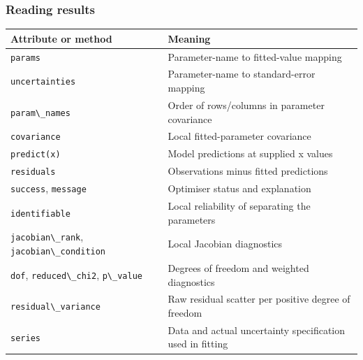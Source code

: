 \documentclass[
  british,
  10pt,
  a4paper,
]{article}
\newcommand{\passthrough}[1]{#1}
\begin{document}

\subsubsection{Reading results}\label{reading-results}

\begin{longtable}[]{@{}
  >{\raggedright\arraybackslash}p{}
  >{\raggedright\arraybackslash}p{}@{}}
\toprule\noalign{}
\begin{minipage}[b]{\linewidth}\raggedright
Attribute or method
\end{minipage} & \begin{minipage}[b]{\linewidth}\raggedright
Meaning
\end{minipage} \\
\midrule\noalign{}
\endhead
\bottomrule\noalign{}
\endlastfoot
\passthrough{\lstinline!params!} & Parameter-name to fitted-value
mapping \\
\passthrough{\lstinline!uncertainties!} & Parameter-name to
standard-error mapping \\
\passthrough{\lstinline!param\_names!} & Order of rows/columns in
parameter covariance \\
\passthrough{\lstinline!covariance!} & Local fitted-parameter
covariance \\
\passthrough{\lstinline!predict(x)!} & Model predictions at supplied x
values \\
\passthrough{\lstinline!residuals!} & Observations minus fitted
predictions \\
\passthrough{\lstinline!success!}, \passthrough{\lstinline!message!} &
Optimiser status and explanation \\
\passthrough{\lstinline!identifiable!} & Local reliability of separating
the parameters \\
\passthrough{\lstinline!jacobian\_rank!},
\passthrough{\lstinline!jacobian\_condition!} & Local Jacobian
diagnostics \\
\passthrough{\lstinline!dof!}, \passthrough{\lstinline!reduced\_chi2!},
\passthrough{\lstinline!p\_value!} & Degrees of freedom and weighted
diagnostics \\
\passthrough{\lstinline!residual\_variance!} & Raw residual scatter per
positive degree of freedom \\
\passthrough{\lstinline!series!} & Data and actual uncertainty
specification used in fitting \\
\end{longtable}
\end{document}
